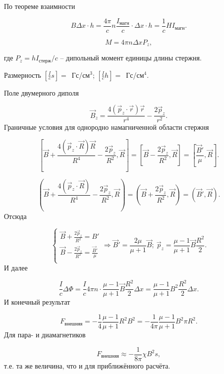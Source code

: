 По теореме взаимности

\begin{equation*}
B\Delta x \cdot h = \frac{4\pi}{c} n \frac{I_{\text{магн}}}{c} \cdot \Delta x \cdot h = \frac{1}{c}HI_{\text{магн}}.
\end{equation*}

\begin{equation*}
M = 4\pi n \Delta x P_z,
\end{equation*}

где $P_z = h I_{\text{стерж}}/c$ -- дипольный момент единицы длины стержня.

Размерность $\left[ \frac{I}{c}s \right] =$~Гс/см$^3$; $\left[ \frac{I}{c}h \right] =$~Гс/см$^4$.

Поле двумерного диполя

\begin{equation*}
\vec B_z = \frac{4(\vec p_z \cdot \vec r) \vec r}{r^4} - \frac{2\vec p_z}{r^2}.
\end{equation*}
Граничные условия для однородно намагниченной области стержня

\begin{equation*}
\left[ \vec B + \frac{4(\vec p_z \cdot \vec R) \vec R}{R^4} - \frac{2\vec p_z}{R^2}, \vec R \right] = \left[ \vec B - \frac{2\vec p_z}{R^2}, \vec R \right] = \left[ \frac{\vec B'}{\mu}, \vec R \right].
\end{equation*}

\begin{equation*}
\left( \vec B + \frac{4(\vec p_z \cdot \vec R)}{R^4} - \frac{2\vec p_z}{R^2}, \vec R \right) = \left( \vec B + \frac{2\vec p_z}{R^2}, \vec R \right) = \left( \vec B', \vec R \right).
\end{equation*}
Отсюда

\begin{equation*}
\begin{cases}
\vec B + \frac{2\vec p_z}{R^2} = B'\\
\vec B - \frac{2\vec p_z}{R^2} = \frac{\vec B'}{\mu}\\
\end{cases}
\Rightarrow \vec B' = \frac{2\mu}{\mu + 1} \vec B;~\vec p_z = \frac{\mu - 1}{\mu + 1} \vec B \frac{R^2}{2}.
\end{equation*}
И далее 

\begin{equation*}
\frac{I}{c}\Delta \Phi = \frac{I}{c} 4\pi n \cdot \frac{\mu - 1}{\mu + 1} \vec B \frac{R^2}{2} \Delta x = \frac{\mu - 1}{\mu + 1} B^2 \frac{R^2}{2} \Delta x.
\end{equation*}
И конечный результат

\begin{equation*}
F_{\text{внешняя}} = - \frac{1}{4} \frac{\mu - 1}{\mu + 1} R^2 B^2 = - \frac{1}{4\pi} \frac{\mu - 1}{\mu + 1} B^2 \pi R^2.
\end{equation*}
Для пара- и диамагнетиков

\begin{equation*}
F_{\text{внешняя}} \approx - \frac{1}{8\pi} \chi B^2 s,
\end{equation*}
т.е. та же величина, что и для приближённого расчёта.



